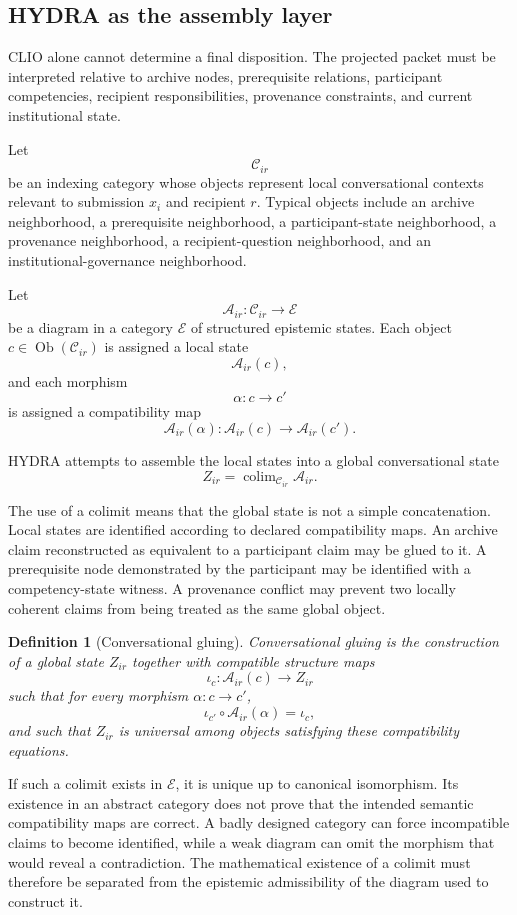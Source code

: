\documentclass[11pt]{article}
\newtheorem{definition}{Definition}[section]
\theoremstyle{definition}
\DeclareMathOperator{\colim}{colim}
\DeclareMathOperator{\Ob}{Ob}
\newcommand{\C}{\mathcal{C}}
\newcommand{\A}{\mathcal{A}}
\begin{document}
\subsection{HYDRA as the assembly layer}

CLIO alone cannot determine a final disposition. The projected packet must be interpreted relative to archive nodes, prerequisite relations, participant competencies, recipient responsibilities, provenance constraints, and current institutional state.

Let
\[
\C_{ir}
\]
be an indexing category whose objects represent local conversational contexts relevant to submission \(x_i\) and recipient \(r\). Typical objects include an archive neighborhood, a prerequisite neighborhood, a participant-state neighborhood, a provenance neighborhood, a recipient-question neighborhood, and an institutional-governance neighborhood.

Let
\[
\A_{ir}:\C_{ir}\longrightarrow\mathscr{E}
\]
be a diagram in a category \(\mathscr{E}\) of structured epistemic states. Each object \(c\in\Ob(\C_{ir})\) is assigned a local state
\[
\A_{ir}(c),
\]
and each morphism
\[
\alpha:c\to c'
\]
is assigned a compatibility map
\[
\A_{ir}(\alpha):
\A_{ir}(c)\to\A_{ir}(c').
\]

HYDRA attempts to assemble the local states into a global conversational state
\[
Z_{ir}
=
\colim_{\C_{ir}}\A_{ir}.
\]

The use of a colimit means that the global state is not a simple concatenation. Local states are identified according to declared compatibility maps. An archive claim reconstructed as equivalent to a participant claim may be glued to it. A prerequisite node demonstrated by the participant may be identified with a competency-state witness. A provenance conflict may prevent two locally coherent claims from being treated as the same global object.

\begin{definition}[Conversational gluing]
Conversational gluing is the construction of a global state \(Z_{ir}\) together with compatible structure maps
\[
\iota_c:\A_{ir}(c)\longrightarrow Z_{ir}
\]
such that for every morphism \(\alpha:c\to c'\),
\[
\iota_{c'}
\circ
\A_{ir}(\alpha)
=
\iota_c,
\]
and such that \(Z_{ir}\) is universal among objects satisfying these compatibility equations.
\end{definition}

If such a colimit exists in \(\mathscr E\), it is unique up to canonical isomorphism. Its existence in an abstract category does not prove that the intended semantic compatibility maps are correct. A badly designed category can force incompatible claims to become identified, while a weak diagram can omit the morphism that would reveal a contradiction. The mathematical existence of a colimit must therefore be separated from the epistemic admissibility of the diagram used to construct it.
\end{document}
